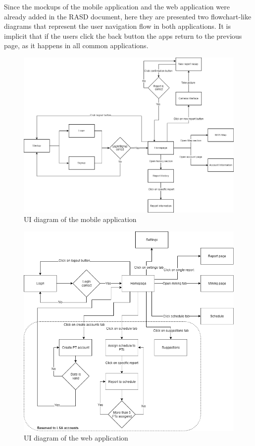 Since the mockups of the mobile application and the web application were already added in the RASD document, here they are presented two flowchart-like diagrams that represent the user navigation flow in both applications. It is implicit that if the users click the back button the apps return to the previous page, as it happens in all common applications.

\vfill

\begin{figure}[H]
  \centering
  \includegraphics[width=1\textwidth]{Images/UI_Mobile_App.png}
  \caption{UI diagram of the mobile application}
  \label{fig:ui_mobile_app}
\end{figure}

\vfill
\newpage
\null
\vfill

\begin{figure}[H]
  \centering
  \includegraphics[width=1\textwidth]{Images/UI_Web_App.png}
  \caption{UI diagram of the web application}
  \label{fig:ui_web_app}
\end{figure}


\vfill
\newpage

